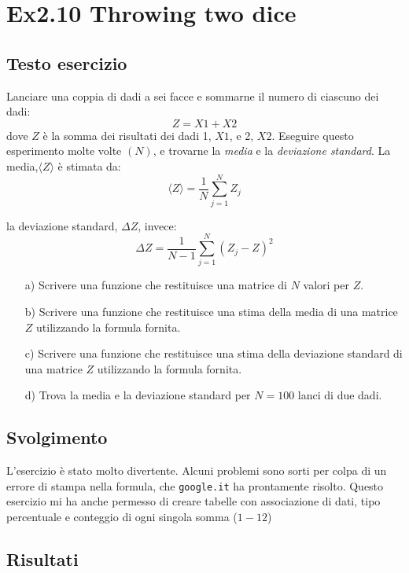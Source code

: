 \section{Ex2.10 Throwing two dice}\label{sec:Throwing_two_dice}

\subsection{Testo esercizio}
Lanciare una coppia di dadi a sei facce e sommarne il numero di ciascuno dei dadi: 
$$Z=X1+X2$$ dove $Z$ è la somma dei risultati dei dadi 1, $X1$, e 2, $X2$. Eseguire 
questo esperimento molte volte $(N)$, e trovarne la \textit{media} e la 
\textit{deviazione standard}.
La media,$\langle Z\rangle$ è stimata da:
$$\langle Z\rangle=\frac{1}{N}\sum_{j=1}^{N}Z_j $$ 

la deviazione standard, $\Delta Z$, invece:
$$\Delta Z=\frac{1}{N-1}\sum_{j=1}^{N}\left(Z_j-Z\right)^2 $$

\begin{itemize}
    \item[a)] Scrivere una funzione che restituisce una matrice di $N$ valori per $Z$.
    
    \item[b)] Scrivere una funzione che restituisce una stima della media di una matrice 
    $Z$ utilizzando la formula fornita.

    \item[c)] Scrivere una funzione che restituisce una stima della deviazione standard 
    di una matrice $Z$ utilizzando la formula fornita.
    
    \item[d)] Trova la media e la deviazione standard per $N=100$ lanci di due dadi.
\end{itemize}

\subsection{Svolgimento}
L'esercizio è stato molto divertente. Alcuni problemi sono sorti per colpa di 
un errore di stampa nella formula, che \verb*|google.it| ha prontamente 
risolto. Questo esercizio mi ha anche permesso di creare tabelle con 
associazione di dati, tipo percentuale e conteggio di ogni singola somma 
($1-12$)
\pagebreak

\subsection{Risultati}
